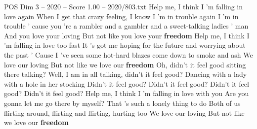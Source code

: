 \begin{textsample}{POS Dim 3 – 2020 – Score 1.00 – 2020/803.txt}  \label{ex:f3_pos_013}
Help me, I think I 'm falling in love again When I get that crazy feeling, I know I 'm in trouble again I 'm in trouble ' cause you 're a rambler and a gambler and a sweet-talking ladies ' man And you love your loving But not like you love your \textbf{freedom} Help me, I think I 'm falling in love too fast It 's got me hoping for the future and worrying about the past ' Cause I 've seen some hot-hard blazes come down to smoke and ash We love our loving But not like we love our \textbf{freedom} Oh, didn't it feel good sitting there talking?
Well, I am in all talking, didn't it feel good?
Dancing with a lady with a hole in her stocking Didn't it feel good?
Didn't it feel good?
Didn't it feel good?
Didn't it feel good?
Help me, I think I 'm falling in love with you Are you gonna let me go there by myself?
That 's such a lonely thing to do Both of us flirting around, flirting and flirting, hurting too We love our loving But not like we love our \textbf{freedom}

\end{textsample}
